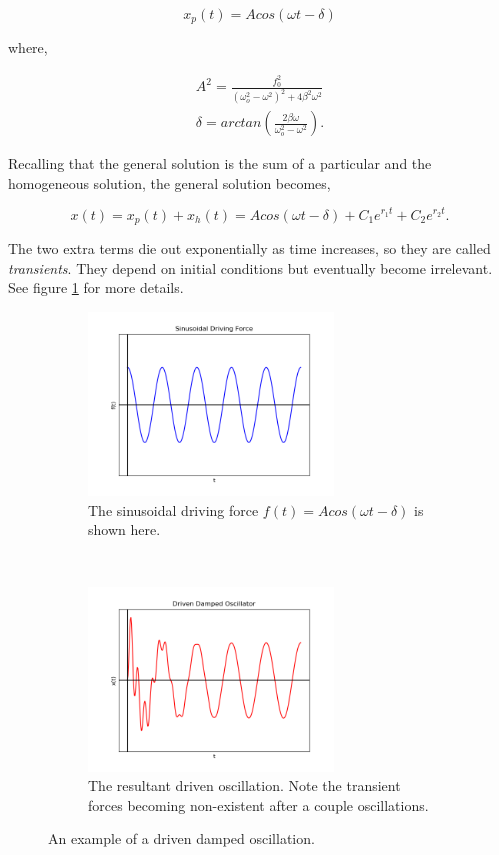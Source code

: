 \begin{equation*}
    x_p(t) = A cos(\omega t - \delta)
\end{equation*}

\noindent where,

\begin{gather*}
    A^2 = \frac{f_0^2}{(\omega_o^2 - \omega^2)^2 + 4\beta^2\omega^2} \\
    \delta = arctan(\frac{2\beta\omega}{\omega_o^2 - \omega^2}).
\end{gather*}

Recalling that the general solution is the sum of a particular and the homogeneous solution, the general solution becomes,

\begin{equation*}
    x(t) = x_p(t) + x_h(t) = A cos(\omega t - \delta) + C_1e^{r_1t} + C_2e^{r_2t}.
\end{equation*}

\noindent The two extra terms die out exponentially as time increases, so they are called {\itshape transients}. They depend on initial conditions but eventually become irrelevant. See figure \ref{fig:driving_osc} for more details.

\begin{figure}[h]
    \centering
    \begin{subfigure}[t]{0.4\textwidth}
        \centering
        \includegraphics[width=6.5cm]{Classical_Mechanics/2.12-damp-osc/driven_osc_force.png}
        \caption{The sinusoidal driving force $f(t) = Acos(\omega t - \delta)$ is shown here.}
    \end{subfigure}
    ~ 
    \begin{subfigure}[t]{0.4\textwidth}
        \centering
        \includegraphics[width=6.5cm]{Classical_Mechanics/2.12-damp-osc/driven_damped_osc1.png}
        \caption{The resultant driven oscillation. Note the transient forces becoming non-existent after a couple oscillations.}
    \end{subfigure}
    \caption{An example of a driven damped oscillation.}
    \label{fig:driving_osc}
\end{figure}